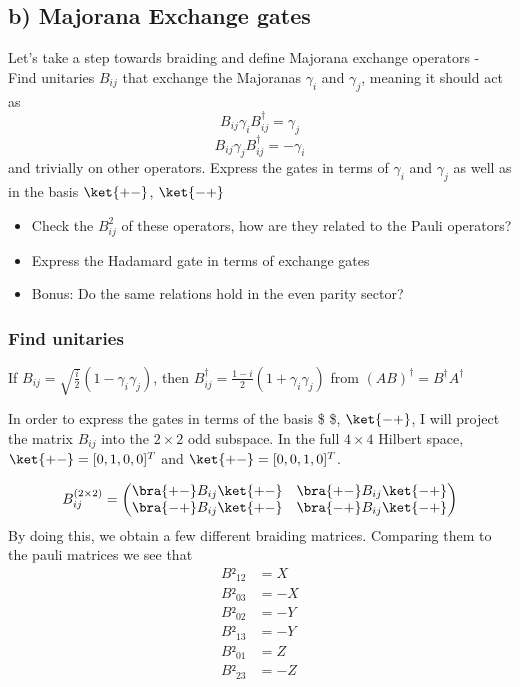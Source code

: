 \documentclass[11pt,landscape]{article}
\providecommand{\tightlist}{%
      \setlength{\itemsep}{0pt}\setlength{\parskip}{0pt}}
\begin{document}
    \subsection{b) Majorana Exchange gates}\label{b-majorana-exchange-gates}

Let's take a step towards braiding and define Majorana exchange
operators - Find unitaries \(B_{ij}\) that exchange the Majoranas
\(γ_i\) and \(γ_j\), meaning it should act as \[
 B_{ij} γ_i B_{ij}^{†} = γ_j
 \] \[
 B_{ij} γ_j B_{ij}^{†} = -γ_i
 \] and trivially on other operators. Express the gates in terms of
\(γ_i\) and \(γ_j\) as well as in the basis \(\ket{+ -}\), \(\ket{-+}\)

\begin{itemize}
\tightlist
\item
  Check the \(B_{ij}^{2}\) of these operators, how are they related to
  the Pauli operators?
\item
  Express the Hadamard gate in terms of exchange gates
\item
  Bonus: Do the same relations hold in the even parity sector?
\end{itemize}

    \subsubsection{Find unitaries}\label{find-unitaries}

If \(\displaystyle  B_{ij} = \sqrt{\frac{i}{2}} (1-γ_iγ_j)\), then
\(\displaystyle  B_{ij}^{†} = \frac{1-i}{2} (1+γ_iγ_j)\) from
\((AB)^{†} = B^{†}A^{†}\)

In order to express the gates in terms of the basis \$\ket{+ - } \$,
\(\ket{-+}\), I will project the matrix \(B_{ij}\) into the \(2× 2\) odd
subspace. In the full \(4× 4\) Hilbert space, \(\ket{+-} = [0,1,0,0]^T\)
and \(\ket{+-} = [0,0,1,0]^T\).

\[
B_{ij}^{(2\times 2)} = 
\begin{pmatrix}
  \bra{+ - } B_{ij} \ket{+-} & \bra{+ - } B_{ij} \ket{-+}\\
  \bra{- + } B_{ij} \ket{+-} & \bra{- + } B_{ij} \ket{-+}
\end{pmatrix}
\] By doing this, we obtain a few different braiding matrices. Comparing
them to the pauli matrices we see that \[
\begin{aligned}
B²_{12} &= X\\
B²_{03} &= -X\\
B²_{02} &= -Y\\
B²_{13} &= -Y\\
B²_{01} &= Z\\
B²_{23} &= -Z
\end{aligned}
\]
\end{document}

